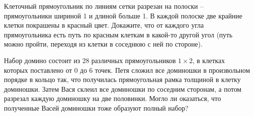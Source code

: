 \documentclass[11pt, a4paper]{../problems_template}
\begin{document}
\begin{exercise}[8]
Клеточный прямоугольник по линиям сетки разрезан на полоски – прямоугольники шириной 1 и длиной больше 1. В каждой полоске две крайние клетки покрашены в красный цвет. Докажите, что от каждого угла \\ прямоугольника есть путь по красным клеткам в какой-то другой угол (путь можно пройти, переходя из клетки в соседнюю с ней по стороне).
\end{exercise}

\begin{exercise}[18]
Набор домино состоит из 28 различных прямоугольников $1 \times 2$, в клетках которых поставлено от 0 до 6 точек. Петя сложил все доминошки в произвольном порядке в кольцо так, что получилась прямоугольная рамка толщиной в клетку доминошки. Затем Вася склеил все доминошки по соседним сторонам, а потом разрезал каждую доминошку на две половинки. Могло ли оказаться, что полученные Васей доминошки тоже образуют полный набор?
\end{exercise}
 
\end{document}
